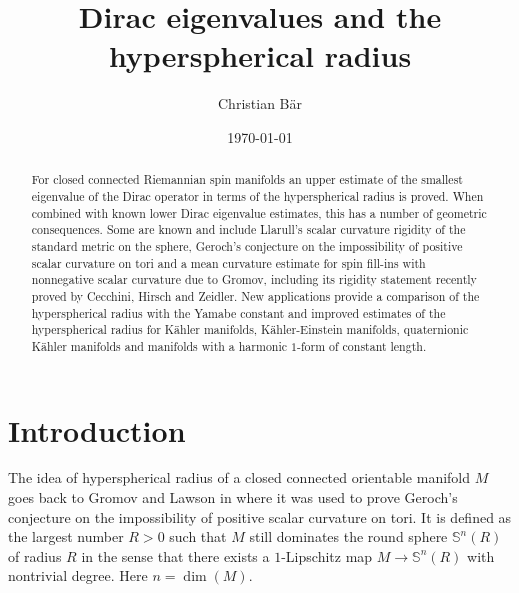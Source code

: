 \documentclass[11pt,reqno]{amsart}
\newcommand{\Sn}{\mathbb{S}^n}
\newcommand{\<}{\langle}
\renewcommand{\>}{\rangle}
\theoremstyle{definition}
\begin{document}
\title{Dirac eigenvalues and the hyperspherical radius} 
\author{Christian B\"ar}
\address{Universit\"at Potsdam, Institut f\"ur Mathematik, 14476 Potsdam, Germany}

\begin{abstract} 
For closed connected Riemannian spin manifolds an upper estimate of the smallest eigenvalue of the Dirac operator in terms of the hyperspherical radius is proved.
When combined with known lower Dirac eigenvalue estimates, this has a number of geometric consequences.
Some are known and include Llarull's scalar curvature rigidity of the standard metric on the sphere, Geroch's conjecture on the impossibility of positive scalar curvature on tori and a mean curvature estimate for spin fill-ins with nonnegative scalar curvature due to Gromov, including its rigidity statement recently proved by Cecchini, Hirsch and Zeidler.
New applications provide a comparison of the hyperspherical radius with the Yamabe constant and improved estimates of the hyperspherical radius for Kähler manifolds, Kähler-Einstein manifolds, quaternionic Kähler manifolds and manifolds with a harmonic $1$-form of constant length.
\end{abstract}



\date{\today}

\maketitle

\section{Introduction} 

The idea of hyperspherical radius of a closed connected orientable manifold $M$ goes back to Gromov and Lawson in \cite{GL} where it was used to prove Geroch's conjecture on the impossibility of positive scalar curvature on tori.
It is defined as the largest number $R>0$ such that $M$ still dominates the round sphere $\Sn(R)$ of radius $R$ in the sense that there exists a $1$-Lipschitz map $M\to\Sn(R)$ with nontrivial degree.
Here $n=\dim(M)$.
\end{document}
